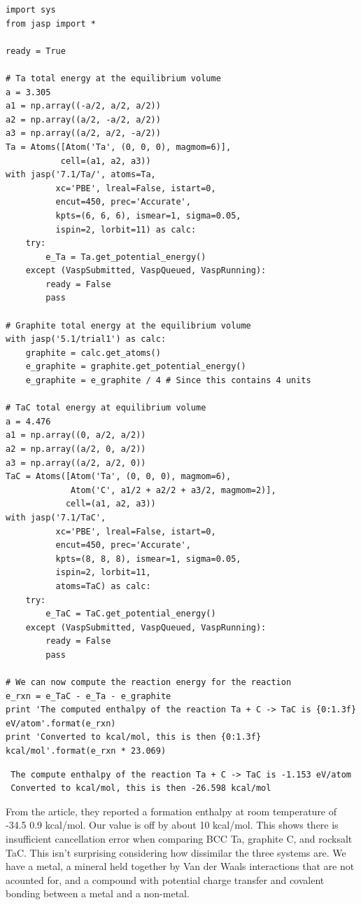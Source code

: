 \documentclass[11pt]{article}
\begin{document}
\begin{verbatim}
import sys
from jasp import *

ready = True

# Ta total energy at the equilibrium volume
a = 3.305
a1 = np.array((-a/2, a/2, a/2))
a2 = np.array((a/2, -a/2, a/2))
a3 = np.array((a/2, a/2, -a/2))
Ta = Atoms([Atom('Ta', (0, 0, 0), magmom=6)],
           cell=(a1, a2, a3))
with jasp('7.1/Ta/', atoms=Ta,
          xc='PBE', lreal=False, istart=0,
          encut=450, prec='Accurate',
          kpts=(6, 6, 6), ismear=1, sigma=0.05,
          ispin=2, lorbit=11) as calc:
    try:
        e_Ta = Ta.get_potential_energy()
    except (VaspSubmitted, VaspQueued, VaspRunning):
        ready = False
        pass 

# Graphite total energy at the equilibrium volume
with jasp('5.1/trial1') as calc:
    graphite = calc.get_atoms()
    e_graphite = graphite.get_potential_energy()
    e_graphite = e_graphite / 4 # Since this contains 4 units

# TaC total energy at equilibrium volume
a = 4.476
a1 = np.array((0, a/2, a/2))
a2 = np.array((a/2, 0, a/2))
a3 = np.array((a/2, a/2, 0))
TaC = Atoms([Atom('Ta', (0, 0, 0), magmom=6),
             Atom('C', a1/2 + a2/2 + a3/2, magmom=2)],
            cell=(a1, a2, a3))
with jasp('7.1/TaC',
          xc='PBE', lreal=False, istart=0,
          encut=450, prec='Accurate',
          kpts=(8, 8, 8), ismear=1, sigma=0.05,
          ispin=2, lorbit=11,
          atoms=TaC) as calc:
    try:
        e_TaC = TaC.get_potential_energy()
    except (VaspSubmitted, VaspQueued, VaspRunning):
        ready = False
        pass

# We can now compute the reaction energy for the reaction
e_rxn = e_TaC - e_Ta - e_graphite
print 'The computed enthalpy of the reaction Ta + C -> TaC is {0:1.3f} eV/atom'.format(e_rxn)
print 'Converted to kcal/mol, this is then {0:1.3f} kcal/mol'.format(e_rxn * 23.069)
\end{verbatim}

\begin{verbatim}
 The compute enthalpy of the reaction Ta + C -> TaC is -1.153 eV/atom
 Converted to kcal/mol, this is then -26.598 kcal/mol
\end{verbatim}

From the article, they reported a formation enthalpy at room temperature of -34.5 \textpm{} 0.9 kcal/mol. Our value is off by about 10 kcal/mol. This shows there is insufficient cancellation error when comparing BCC Ta, graphite C, and rocksalt TaC. This isn't surprising considering how dissimilar the three systems are. We have a metal, a mineral held together by Van der Waals interactions that are not acounted for, and a compound with potential charge transfer and covalent bonding between a metal and a non-metal.
\end{document}
